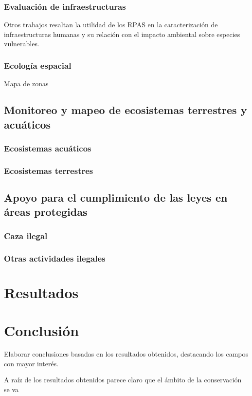 \documentclass[11pt,]{article}
\begin{document}
\subsubsection{Evaluación de
infraestructuras}\label{evaluacion-de-infraestructuras}

Otros trabajos resaltan la utilidad de los RPAS en la caracterización de
infraestructuras humanas y su relación con el impacto ambiental sobre
especies vulnerables.

\subsubsection{Ecología espacial}\label{ecologia-espacial}

Mapa de zonas

\subsection{Monitoreo y mapeo de ecosistemas terrestres y
acuáticos}\label{monitoreo-y-mapeo-de-ecosistemas-terrestres-y-acuaticos}

\subsubsection{Ecosistemas acuáticos}\label{ecosistemas-acuaticos}

\subsubsection{Ecosistemas terrestres}\label{ecosistemas-terrestres}

\subsection{Apoyo para el cumplimiento de las leyes en áreas
protegidas}\label{apoyo-para-el-cumplimiento-de-las-leyes-en-areas-protegidas}

\subsubsection{Caza ilegal}\label{caza-ilegal}

\subsubsection{Otras actividades
ilegales}\label{otras-actividades-ilegales}

\section{Resultados}\label{resultados}

\section{Conclusión}\label{conclusion}

Elaborar conclusiones basadas en los resultados obtenidos, destacando
los campos con mayor interés.

A raíz de los resultados obtenidos parece claro que el ámbito de la
conservación se va

\newpage
\singlespacing 

\end{document}
